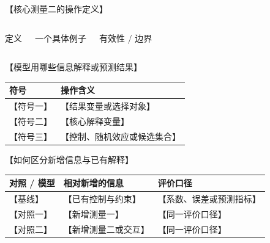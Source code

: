 \documentclass[aspectratio=169,11pt,fontset=fandol]{ctexbeamer}
\begin{document}
\begin{frame}{【核心测量二的操作定义】}
  \vspace{.8em}
  \begin{columns}[T,onlytextwidth]
      {\color{Accent}定义}\par
      \par
      \vspace{.7em}
      {\color{Accent}一个具体例子}\par
      \par
      \vspace{.7em}
      {\color{Accent}有效性 / 边界}\par
  \end{columns}
\end{frame}

\begin{frame}{【模型用哪些信息解释或预测结果】}
  \vspace{.5em}
  \centering
  \par
  \vspace{.7em}
  {\small
  \begin{tabular}{@{}l p{8.8cm}@{}}
    \toprule
    符号 & 操作含义 \\
    \midrule
    【符号一】 & 【结果变量或选择对象】 \\
    【符号二】 & 【核心解释变量】 \\
    【符号三】 & 【控制、随机效应或候选集合】 \\
    \bottomrule
  \end{tabular}}
\end{frame}

\begin{frame}{【如何区分新增信息与已有解释】}
  \vspace{.4em}
  {\small
  \begin{tabular}{@{}p{3.2cm} p{5.2cm} p{4.6cm}@{}}
    \toprule
    对照 / 模型 & 相对新增的信息 & 评价口径 \\
    \midrule
    【基线】 & 【已有控制与约束】 & 【系数、误差或预测指标】 \\
    【对照一】 & 【新增测量一】 & 【同一评价口径】 \\
    【对照二】 & 【新增测量二或交互】 & 【同一评价口径】 \\
    \bottomrule
  \end{tabular}}
\end{frame}
\end{document}
